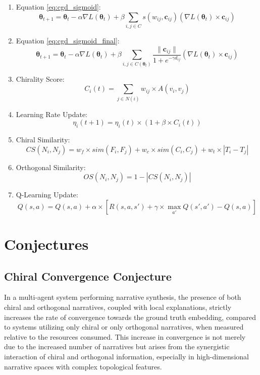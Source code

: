 \documentclass{article}
\begin{document}
\begin{enumerate}
    \item  Equation \ref{eq:cgd_sigmoid}:  
    \[
    \boldsymbol{\theta}_{t+1} = \boldsymbol{\theta}_t - \alpha \nabla L(\boldsymbol{\theta}_t) + \beta \sum_{i,j \in C} s(w_{ij}, \mathbf{c}_{ij}) (\nabla L(\boldsymbol{\theta}_t) \times \mathbf{c}_{ij})
    \]
    \item Equation \ref{eq:cgd_sigmoid_final}:
    \[
    \boldsymbol{\theta}_{t+1} = \boldsymbol{\theta}_t - \alpha \nabla L(\boldsymbol{\theta}_t) + \beta \sum_{i,j \in C(\boldsymbol{\theta}_t)}  \frac{\| \mathbf{c}_{ij} \|}{1 + e^{-\gamma d_{ij}}} (\nabla L(\boldsymbol{\theta}_t) \times \mathbf{c}_{ij})
    \]
    \item Chirality Score:
    \[
    C_i(t) = \sum_{j \in N(i)} w_{ij} \times A(v_i, v_j)
    \]
    \item Learning Rate Update:
    \[
    \eta_i(t+1) = \eta_i(t) \times (1 + \beta \times C_i(t))
    \]
    \item Chiral Similarity:
    \[
    CS(N_i, N_j) = w_f \times sim(F_i, F_j) + w_c \times sim(C_i, C_j) + w_t \times |T_i - T_j|
    \]
    \item Orthogonal Similarity:
    \[
    OS(N_i, N_j) = 1 - |CS(N_i, N_j)|
    \]
    \item Q-Learning Update:
    \[
    Q(s, a) = Q(s, a) + \alpha \times [R(s, a, s') + \gamma \times \max_{a'} Q(s', a') - Q(s, a)]
    \]
\end{enumerate}


\section{Conjectures}

\subsection{Chiral Convergence Conjecture}

In a multi-agent system performing narrative synthesis, the presence of both chiral and orthogonal narratives, coupled with local explanations, strictly increases the rate of convergence towards the ground truth embedding, compared to systems utilizing only chiral or only orthogonal narratives, when measured relative to the resources consumed. This increase in convergence is not merely due to the increased number of narratives but arises from the synergistic interaction of chiral and orthogonal information, especially in high-dimensional narrative spaces with complex topological features.
\end{document}
